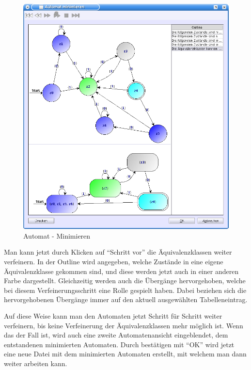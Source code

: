   \begin{figure}[h!]
  \begin{center}
  \includegraphics[width=12cm]{../images/minimize.png}
  \caption{Automat - Minimieren}
  \end{center}
  \end{figure}
  
  \newpage
  Man kann jetzt durch Klicken auf "`Schritt vor"' die Äquivalenzklassen weiter
  verfeinern. In der Outline wird angegeben, welche Zustände in eine eigene
  Äquivalenzklasse gekommen sind, und diese werden jetzt auch in einer anderen
  Farbe dargestellt. Gleichzeitig werden auch die Übergänge hervorgehoben, welche
  bei diesem Verfeinerungsschritt eine Rolle gespielt haben. Dabei beziehen sich
  die hervorgehobenen Übergänge immer auf den aktuell ausgewählten
  Tabelleneintrag.\vspace{10pt}
  
  Auf diese Weise kann man den Automaten jetzt Schritt für Schritt weiter
  verfeinern, bis keine Verfeinerung der Äquivalenzklassen mehr möglich ist. Wenn
  das der Fall ist, wird auch eine zweite Automatenansicht eingeblendet, dem
  entstandenen minimierten Automaten. Durch bestätigen mit "`OK"' wird jetzt
  eine neue Datei mit dem minimierten Automaten erstellt, mit welchem man dann
  weiter arbeiten kann.\vspace{10pt}
  
